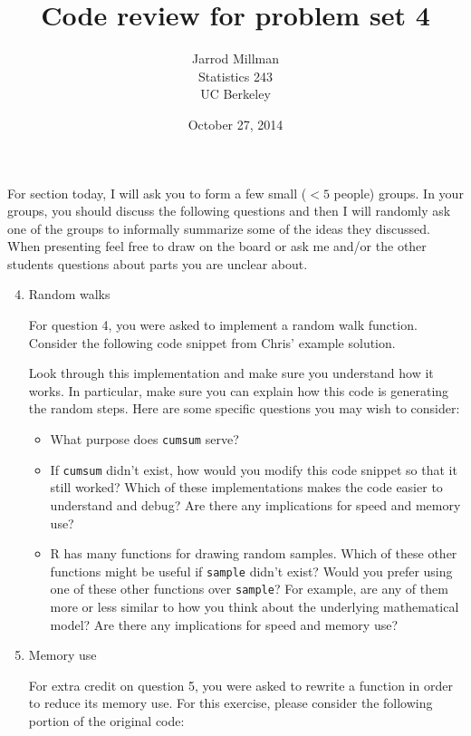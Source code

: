 \documentclass{article}
\title{Code review for problem set 4}
\date{October 27, 2014}
\author{Jarrod Millman\\ Statistics 243\\ UC Berkeley}
\begin{document}
\maketitle

For section today, I will ask you to form a few small ($<5$ people) groups.
In your groups, you should discuss the following questions and then I will
randomly ask one of the groups to informally summarize some of the ideas
they discussed.  When presenting feel free to draw on the board or ask
me and/or the other students questions about parts you are unclear about.

\begin{enumerate}
\setcounter{enumi}{3}

\item Random walks

For question 4, you were asked to implement a random walk function. Consider
the following code snippet from Chris' example solution.


Look through this implementation and make sure you understand how it works.
In particular, make sure you can explain how this code is generating the
random steps.  Here are some specific questions you may wish to consider:

\begin{itemize}
\item What purpose does \texttt{cumsum} serve?
\item If \texttt{cumsum} didn't exist, how would you modify this code snippet
 so that it still worked?  Which of these implementations makes the code easier
 to understand and debug?  Are there any implications for speed and memory use?
\item R has many functions for drawing random samples.  Which of these other
 functions might be useful if \texttt{sample} didn't exist?  Would you prefer
 using one of these other functions over \texttt{sample}?  For example, are
 any of them more or less similar to how you think about the underlying mathematical
 model?  Are there any implications for speed and memory use?
\end{itemize}

\item Memory use

For extra credit on question 5, you were asked to rewrite a function in
order to reduce its memory use.  For this exercise, please consider the following
portion of the original code:


\end{enumerate}
\end{document}
